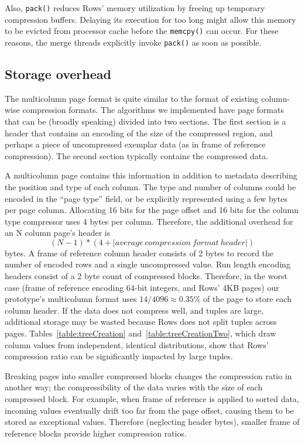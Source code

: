 \documentclass{sig-alternate-sigmod08}
\newcommand{\rows}{Rows\xspace}
\newcommand{\rowss}{Rows'\xspace}
\begin{document}
Also, {\tt pack()} reduces \rowss memory utilization by freeing up
temporary compression buffers.  Delaying its execution for too long
might allow this memory to be evicted from processor cache before the
{\tt memcpy()} can occur.  For these reasons, the merge threads
explicitly invoke {\tt pack()} as soon as possible.

\subsection{Storage overhead}

The multicolumn page format is quite similar to the format of existing
column-wise compression formats.  The algorithms we implemented have
page formats that can be (broadly speaking) divided into two sections.
The first section is a header that contains an encoding of the size of
the compressed region, and perhaps a piece of uncompressed exemplar
data (as in frame of reference compression).  The second section
typically contains the compressed data.

A multicolumn page contains this information in addition to metadata
describing the position and type of each column.  The type and number
of columns could be encoded in the ``page type'' field, or be
explicitly represented using a few bytes per page column.  Allocating
16 bits for the page offset and 16 bits for the column type compressor
uses 4 bytes per column.  Therefore, the additional overhead for an N
column page's header is
\[
   (N-1) * (4 + |average~compression~format~header|)
\]
bytes.  A frame of reference column header consists of 2 bytes to
record the number of encoded rows and a single uncompressed
value. Run length encoding headers consist of a 2 byte count of
compressed blocks.  Therefore, in the worst case (frame of reference
encoding 64-bit integers, and \rowss 4KB pages) our prototype's
multicolumn format uses $14/4096\approx0.35\%$ of the page to store
each column header.  If the data does not compress well, and tuples
are large, additional storage may be wasted because \rows does not
split tuples across pages.  Tables~\ref{table:treeCreation}
and~\ref{table:treeCreationTwo}, which draw column values from
independent, identical distributions, show that \rowss compression
ratio can be significantly impacted by large tuples.


Breaking pages into smaller compressed blocks changes the compression
ratio in another way; the compressibility of the data varies with the
size of each compressed block.  For example, when frame of reference
is applied to sorted data, incoming values eventually drift too far
from the page offset, causing them to be stored as exceptional values.
Therefore (neglecting header bytes), smaller frame of reference blocks
provide higher compression ratios.
\end{document}
